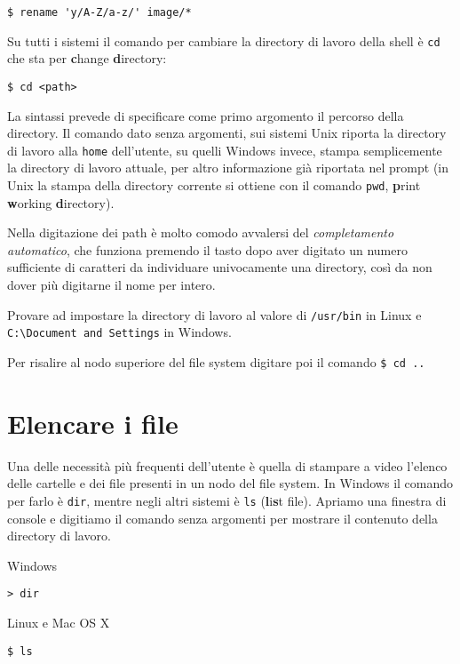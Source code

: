 \begin{verbatim}
$ rename 'y/A-Z/a-z/' image/*
\end{verbatim}

Su tutti i sistemi il comando per cambiare la directory di lavoro della shell è \texttt{cd} che sta per \textbf{c}hange \textbf{d}irectory:

\begin{tcolorbox}
\begin{verbatim}
$ cd <path>
\end{verbatim}
\end{tcolorbox}

La sintassi prevede di specificare come primo argomento il percorso della directory. Il comando dato senza argomenti, sui sistemi Unix riporta la directory di lavoro alla \texttt{home} dell'utente, su quelli Windows invece, stampa semplicemente la directory di lavoro attuale, per altro informazione già riportata nel prompt (in Unix la stampa della directory corrente si ottiene con il comando \texttt{pwd}, \textbf{p}rint \textbf{w}orking \textbf{d}irectory).

Nella digitazione dei path è molto comodo avvalersi del \emph{completamento automatico}, che funziona premendo il tasto  dopo aver digitato un numero sufficiente di caratteri da individuare univocamente una directory, così da non dover più digitarne il nome per intero.

Provare ad impostare la directory di lavoro al valore di \verb=/usr/bin= in Linux e \verb=C:\Document and Settings= in Windows.

Per risalire al nodo superiore del file system digitare poi il comando \verb=$ cd ..=

\section{Elencare i file}

Una delle necessità più frequenti dell'utente è quella di stampare a video l'elenco delle cartelle e dei file presenti in un nodo del file system. In Windows il comando per farlo è \texttt{dir}, mentre negli altri sistemi è \texttt{ls} (\textbf{l}i\textbf{s}t file). Apriamo una finestra di console e digitiamo il comando senza argomenti per mostrare il contenuto della directory di lavoro.

\noindent\begin{tcolorbox}[width=(\linewidth-6pt)/2,before=,after=\hfill]
Windows\tcblower
\begin{verbatim}
> dir
\end{verbatim}
\end{tcolorbox}
\begin{tcolorbox}[width=(\linewidth-6pt)/2,before=,after=\hfill]
Linux e Mac OS X\tcblower
\begin{verbatim}
$ ls
\end{verbatim}
\end{tcolorbox}



